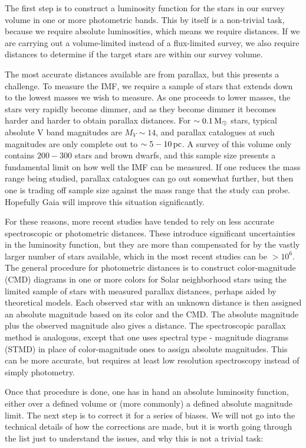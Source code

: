 \documentclass[a4paper,10pt]{article}
\begin{document}
{\noindent}The first step is to construct a luminosity function for the stars in our survey volume in one or more photometric bands. This by itself is a non-trivial task, because we require absolute luminosities, which means we require distances. If we are carrying out a volume-limited instead of a flux-limited survey, we also require distances to determine if the target stars are within our survey volume.

{\noindent}The most accurate distances available are from parallax, but this presents a challenge. To measure the IMF, we require a sample of stars that extends down to the lowest masses we wish to measure. As one proceeds to lower masses, the stars very rapidly become dimmer, and as they become dimmer it becomes harder and harder to obtain parallax distances. For $\sim0.1\,{\rm M_\odot}$ stars, typical absolute V band magnitudes are $M_V\sim14$, and parallax catalogues at such magnitudes are only complete out to $\sim5-10\,{\rm pc}$. A survey of this volume only contains $200-300$ stars and brown dwarfs, and this sample size presents a fundamental limit on how well the IMF can be measured. If one reduces the mass range being studied, parallax catalogues can go out somewhat further, but then one is trading off sample size against the mass range that the study can probe. Hopefully Gaia will improve this situation significantly.

{\noindent}For these reasons, more recent studies have tended to rely on less accurate spectroscopic or photometric distances. These introduce significant uncertainties in the luminosity function, but they are more than compensated for by the vastly larger number of stars available, which in the most recent studies can be $>10^6$. The general procedure for photometric distances is to construct color-magnitude (CMD) diagrams in one or more colors for Solar neighborhood stars using the limited sample of stars with measured parallax distances, perhaps aided by theoretical models. Each observed star with an unknown distance is then assigned an absolute magnitude based on its color and the CMD. The absolute magnitude plus the observed magnitude also gives a distance. The spectroscopic parallax method is analogous, except that one uses spectral type - magnitude diagrams (STMD) in place of color-magnitude ones to assign absolute magnitudes. This can be more accurate, but requires at least low resolution spectroscopy instead of simply photometry.

{\noindent}Once that procedure is done, one has in hand an absolute luminosity function, either over a defined volume or (more commonly) a defined absolute magnitude limit. The next step is to correct it for a series of biases. We will not go into the technical details of how the corrections are made, but it is worth going through the list just to understand the issues, and why this is not a trivial task:
\end{document}
